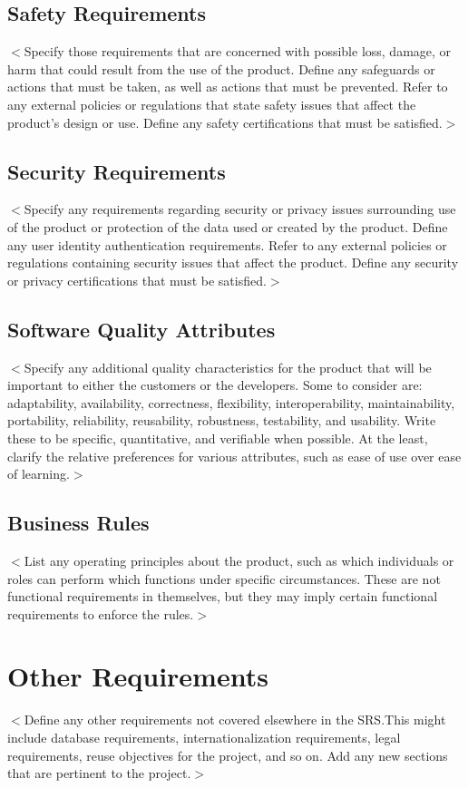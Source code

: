\documentclass{scrreprt}
\begin{document}
\section{Safety Requirements}
$<$Specify those requirements that are concerned with possible loss, damage, or 
harm that could result from the use of the product. Define any safeguards or 
actions that must be taken, as well as actions that must be prevented. Refer to 
any external policies or regulations that state safety issues that affect the 
product’s design or use. Define any safety certifications that must be 
satisfied.$>$

\section{Security Requirements}
$<$Specify any requirements regarding security or privacy issues surrounding use 
of the product or protection of the data used or created by the product. Define 
any user identity authentication requirements. Refer to any external policies or 
regulations containing security issues that affect the product. Define any 
security or privacy certifications that must be satisfied.$>$

\section{Software Quality Attributes}
$<$Specify any additional quality characteristics for the product that will be 
important to either the customers or the developers. Some to consider are: 
adaptability, availability, correctness, flexibility, interoperability, 
maintainability, portability, reliability, reusability, robustness, testability, 
and usability. Write these to be specific, quantitative, and verifiable when 
possible. At the least, clarify the relative preferences for various attributes, 
such as ease of use over ease of learning.$>$

\section{Business Rules}
$<$List any operating principles about the product, such as which individuals or 
roles can perform which functions under specific circumstances. These are not 
functional requirements in themselves, but they may imply certain functional 
requirements to enforce the rules.$>$

\chapter{Other Requirements}
$<$Define any other requirements not covered elsewhere in the SRS.\@ This might 
include database requirements, internationalization requirements, legal 
requirements, reuse objectives for the project, and so on. Add any new sections 
that are pertinent to the project.$>$
\end{document}
